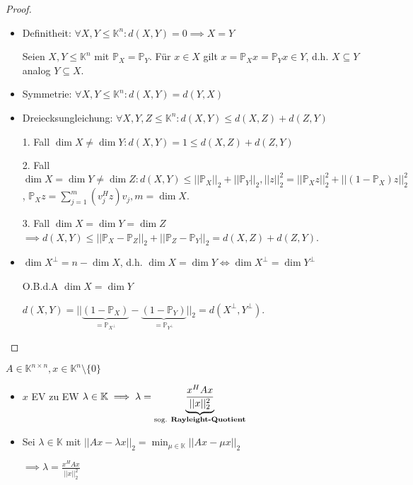 \begin{proof}
	\begin{itemize}
		\item Definitheit: $\forall X,Y \leq \mathbb{K}^n: d(X,Y) = 0 \implies X=Y$
		
		Seien $X,Y \leq \mathbb{K}^n$ mit $\mathbb{P}_X = \mathbb{P}_Y$. Für $x \in X$ gilt $x = \mathbb{P}_Xx = \mathbb{P}_Yx \in Y$, d.h. $X \subseteq Y$ analog $Y \subseteq X$.
		
		\item Symmetrie: $\forall X,Y \leq \mathbb{K}^n: d(X,Y) = d(Y,X)$
		
		\item Dreiecksungleichung: $\forall X,Y,Z \leq \mathbb{K}^n: d(X,Y) \leq d(X,Z) + d(Z,Y)$
		
		1. Fall $\dim X \neq \dim Y: d(X,Y) = 1 \leq d(X,Z) + d(Z,Y)$
		
		2. Fall $\dim X = \dim Y \neq \dim Z: d(X,Y) \leq ||\mathbb{P}_X||_2 + ||\mathbb{P}_Y||_2, ||z||_2^2 = ||\mathbb{P}_Xz||_2^2 + ||(1-\mathbb{P}_X)z||_2^2$, $\mathbb{P}_Xz = \sum_{j=1}^{m}(v_j^Hz)v_j, m = \dim X$.
		
		3. Fall $\dim X = \dim Y = \dim Z$ $\implies d(X,Y) \leq ||\mathbb{P}_X - \mathbb{P}_Z||_2 + ||\mathbb{P}_Z - \mathbb{P}_Y||_2 = d(X,Z) + d(Z,Y)$.
		
		\item $\dim X^\perp = n - \dim X$, d.h. $\dim X = \dim Y \iff \dim X^\perp = \dim Y^\perp$
		
		O.B.d.A $\dim X = \dim Y$
		
		$d(X,Y) = ||\underbrace{(1-\mathbb{P}_X)}_{=\mathbb{P}_{X^\perp}} - \underbrace{(1- \mathbb{P}_Y)}_{=\mathbb{P}_{Y^\perp}}||_2 = d(X^\perp, Y^\perp).$
	\end{itemize}
\end{proof}

\begin{lemma}
	$A \in \mathbb{K}^{n\times n}, x \in \mathbb{K}^n\setminus\{0\}$
	\begin{itemize}
		\item $x$ EV zu EW $\lambda \in \mathbb{K} \implies \lambda = \underbrace{\frac{x^HAx}{||x||_2^2}}_{\text{sog. \textbf{Rayleight-Quotient}}}$
		\item Sei $\lambda \in \mathbb{K}$ mit $||Ax - \lambda x||_2 = \min_{\mu \in \mathbb{K}} ||Ax - \mu x||_2$
		
		$\implies \lambda = \frac{x^HAx}{||x||_2^2}$
	\end{itemize}
\end{lemma}

